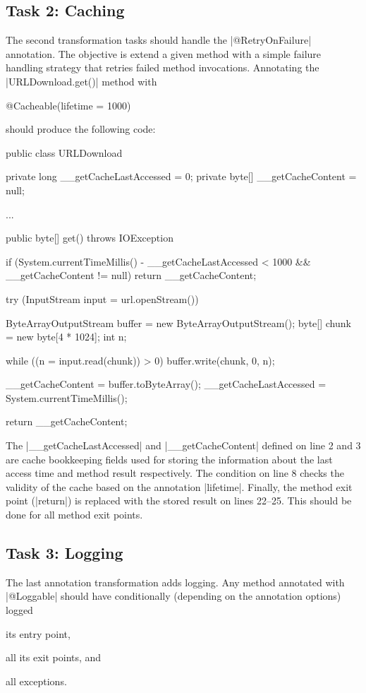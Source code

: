\subsection{Task 2: Caching}

The second transformation tasks should handle the \javainline|@RetryOnFailure| annotation.
The objective is extend a given method with a simple failure handling strategy that retries failed method invocations.
Annotating the \javainline|URLDownload.get()| method with
%
\begin{javacode}
@Cacheable(lifetime = 1000)
\end{javacode}
%
should produce the following code:
%
\begin{javacode}
public class URLDownload {
  private long __getCacheLastAccessed = 0;
  private byte[] __getCacheContent = null;

  ...

  public byte[] get() throws IOException {
    if (System.currentTimeMillis() - __getCacheLastAccessed < 1000 && __getCacheContent != null) {
      return __getCacheContent;
    }

    try (InputStream input = url.openStream()) {
      ByteArrayOutputStream buffer = new ByteArrayOutputStream();
      byte[] chunk = new byte[4 * 1024];
      int n;

      while ((n = input.read(chunk)) > 0) {
        buffer.write(chunk, 0, n);
      }

      __getCacheContent = buffer.toByteArray();
      __getCacheLastAccessed = System.currentTimeMillis();
      
      return __getCacheContent;
    }
  }
}
\end{javacode}

The \javainline|__getCacheLastAccessed| and \javainline|__getCacheContent| defined on line 2 and 3 are cache bookkeeping fields used for storing the information about the last access time and method result respectively.
The condition on line 8 checks the validity of the cache based on the annotation \javainline|lifetime|.
Finally, the method exit point (\javainline|return|) is replaced with the stored result on lines 22--25.
This should be done for all method exit points.

\subsection{Task 3: Logging}

The last annotation transformation adds logging.
Any method annotated with \javainline|@Loggable| should have conditionally (depending on the annotation options) logged
\begin{inparaenum}[(i)]
\item its entry point, 
\item all its exit points, and 
\item all exceptions. 
\end{inparaenum}

